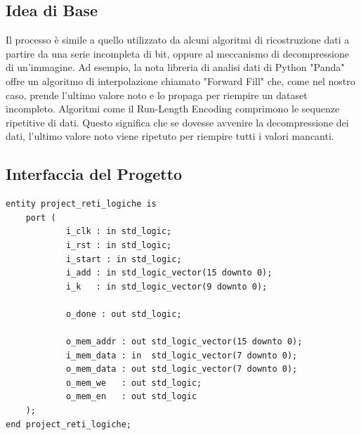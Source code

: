 \documentclass[12pt]{article}
\begin{document}
\subsection{Idea di Base}
Il processo è simile a quello utilizzato da alcuni algoritmi di ricostruzione dati a partire da una serie incompleta di bit, oppure al meccanismo di decompressione di un'immagine.
Ad esempio, la nota libreria di analisi dati di Python "Panda" offre un algoritmo di interpolazione chiamato "Forward Fill" che, come nel nostro caso, prende l'ultimo valore noto e lo propaga per riempire un dataset incompleto.
Algoritmi come il Run-Length Encoding comprimono le sequenze ripetitive di dati. Questo significa che se dovesse avvenire la decompressione dei dati, l'ultimo valore noto viene ripetuto per riempire tutti i valori mancanti.

\newpage
\subsection{Interfaccia del Progetto}
\begin{lstlisting}[caption={interfaccia di progetto}, label=lst:vhdl_example]
entity project_reti_logiche is
    port (
            i_clk : in std_logic;
            i_rst : in std_logic;
            i_start : in std_logic;
            i_add : in std_logic_vector(15 downto 0);
            i_k   : in std_logic_vector(9 downto 0);
            
            o_done : out std_logic;
            
            o_mem_addr : out std_logic_vector(15 downto 0);
            i_mem_data : in  std_logic_vector(7 downto 0);
            o_mem_data : out std_logic_vector(7 downto 0);
            o_mem_we   : out std_logic;
            o_mem_en   : out std_logic
    );
end project_reti_logiche;
\end{lstlisting}
\end{document}
